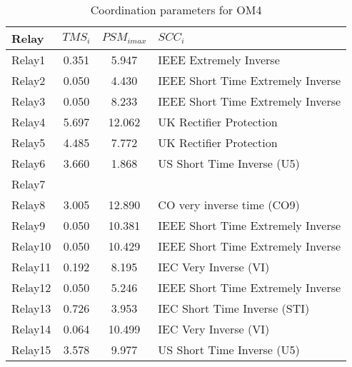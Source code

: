 \documentclass[journal,article,submit,pdftex,moreauthors]{Definitions/mdpi}
\begin{document}
\begin{table}[H]
\caption{Coordination parameters for OM4}
\label{tablaDialOM4}
\centering
\begin{tabular}{lccl}
\toprule
\textbf{Relay }	& \textbf{ $TMS_i$} &     \textbf{ $PSM_{imax}$} & \textbf{$SCC_i$}\\
\midrule
Relay1 & 0.351 & 5.947 & IEEE Extremely Inverse \\
Relay2 & 0.050 & 4.430 & IEEE Short Time Extremely Inverse \\
Relay3 & 0.050 & 8.233 & IEEE Short Time Extremely Inverse \\
Relay4 & 5.697 & 12.062 & UK Rectifier Protection \\
Relay5 & 4.485 & 7.772 & UK Rectifier Protection \\
Relay6 & 3.660 & 1.868 & US Short Time Inverse (U5) \\
Relay7 &  &  &  \\ 
Relay8 & 3.005 & 12.890 & CO very inverse time (CO9) \\
Relay9 & 0.050 & 10.381 & IEEE Short Time Extremely Inverse \\
Relay10 & 0.050 & 10.429 & IEEE Short Time Extremely Inverse \\
Relay11 & 0.192 & 8.195 & IEC Very Inverse (VI) \\
Relay12 & 0.050 & 5.246 & IEEE Short Time Extremely Inverse \\
Relay13 & 0.726 & 3.953 & IEC Short Time Inverse (STI) \\
Relay14 & 0.064 & 10.499 & IEC Very Inverse (VI) \\
Relay15 & 3.578 & 9.977 & US Short Time Inverse (U5) \\
\bottomrule
\end{tabular}
\end{table}



\end{document}
